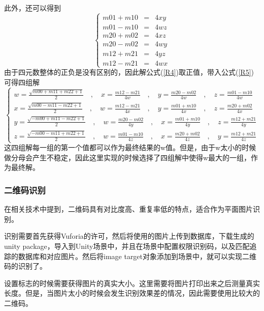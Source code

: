 此外，还可以得到
\begin{equation}\label{R5}
\left\{
\begin{aligned}
m01 + m10 &=& 4xy  \\
m01 - m10 &=& 4wz  \\
m20 + m02 &=& 4xz  \\
m20 - m02 &=& 4wy  \\
m12 + m21 &=& 4yz  \\
m12 - m21 &=& 4wx  
\end{aligned}
\right.
\end{equation}
由于四元数整体的正负是没有区别的，因此解公式(\ref{R4})取正值，带入公式(\ref{R5})可得四组解
\begin{equation}\label{R6}
\left\{
\begin{aligned}
w=\frac{\sqrt{m00 + m11 + m22 + 1}}{2} \quad\mathrm{,}\quad x = \frac{m12 - m21}{4w} \quad\mathrm{,}\quad y = \frac{m20 - m02}{4w} \quad\mathrm{,}\quad z = \frac{m01 - m10}{4w}\\
x=\frac{\sqrt{m00 - m11 - m22 + 1}}{2} \quad\mathrm{,}\quad w = \frac{m12 - m21}{4x} \quad\mathrm{,}\quad y = \frac{m01 + m10}{4x} \quad\mathrm{,}\quad z = \frac{m20 + m02}{4x}\\
y=\frac{\sqrt{-m00 + m11 - m22 + 1}}{2} \quad\mathrm{,}\quad w = \frac{m20 - m02}{4y} \quad\mathrm{,}\quad x = \frac{m01 + m10}{4y} \quad\mathrm{,}\quad z = \frac{m12 + m21}{4y}\\
z=\frac{\sqrt{-m00 - m11 + m22 + 1}}{2} \quad\mathrm{,}\quad w = \frac{m01 - m10}{4z} \quad\mathrm{,}\quad x = \frac{m20 + m02}{4z} \quad\mathrm{,}\quad y = \frac{m12 + m21}{4z}
\end{aligned}
\right.
\end{equation}
这四组解每一组的第一个值都可以作为最终结果的w值。但是，由于w太小的时候做分母会产生不稳定\cite{akenine2018real}，因此这里实现的时候选择了四组解中使得w最大的一组，作为最终解。

\subsubsection{二维码识别}
在相关技术中提到，二维码具有对比度高、重复率低的特点，适合作为平面图片识别。

识别需要首先获得Vuforia的许可，然后将使用的图片上传到数据库，下载生成的unity package，导入到Unity场景中，并且在场景中配置权限识别码，以及匹配追踪的数据库和对应图片。然后将image target对象添加到场景中，就可以实现二维码的识别了。

设置标志的时候需要获得图片的真实大小。这里需要将图片打印出来之后测量真实长度。但是，当图片太小的时候会发生识别效果差的情况，因此需要使用比较大的二维码。


